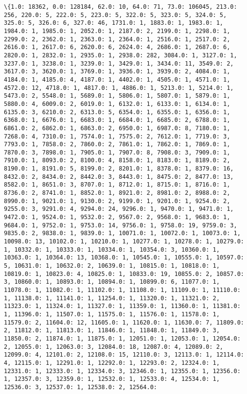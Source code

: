 \documentclass[11pt]{article}
\begin{document}
    \begin{Verbatim}[commandchars=\\\{\}]
\{1.0: 18362, 0.0: 128184, 62.0: 10, 64.0: 71, 73.0: 106045, 213.0: 256, 220.0: 5, 222.0: 5, 223.0: 5, 322.0: 5, 323.0: 5, 324.0: 5, 325.0: 5, 326.0: 6, 327.0: 46, 1731.0: 1, 1883.0: 1, 1983.0: 1, 1984.0: 1, 1985.0: 1, 2052.0: 1, 2187.0: 2, 2199.0: 1, 2298.0: 1, 2299.0: 2, 2362.0: 1, 2363.0: 1, 2364.0: 1, 2516.0: 1, 2517.0: 2, 2616.0: 1, 2617.0: 6, 2620.0: 6, 2624.0: 4, 2686.0: 1, 2687.0: 6, 2820.0: 1, 2832.0: 1, 2935.0: 1, 2938.0: 282, 3084.0: 1, 3127.0: 1, 3237.0: 1, 3238.0: 1, 3239.0: 1, 3429.0: 1, 3434.0: 11, 3549.0: 2, 3617.0: 3, 3620.0: 1, 3769.0: 1, 3936.0: 1, 3939.0: 2, 4084.0: 1, 4184.0: 1, 4185.0: 4, 4187.0: 1, 4402.0: 1, 4505.0: 1, 4571.0: 1, 4572.0: 12, 4718.0: 1, 4817.0: 1, 4886.0: 1, 5213.0: 1, 5214.0: 1, 5473.0: 2, 5548.0: 1, 5689.0: 1, 5806.0: 1, 5807.0: 1, 5879.0: 1, 5880.0: 4, 6009.0: 2, 6019.0: 1, 6132.0: 1, 6133.0: 1, 6134.0: 1, 6135.0: 3, 6210.0: 2, 6313.0: 5, 6354.0: 1, 6355.0: 1, 6356.0: 1, 6368.0: 1, 6676.0: 1, 6683.0: 1, 6684.0: 1, 6685.0: 2, 6788.0: 1, 6861.0: 2, 6862.0: 1, 6863.0: 2, 6950.0: 1, 6987.0: 8, 7180.0: 1, 7268.0: 4, 7310.0: 1, 7574.0: 1, 7575.0: 2, 7612.0: 1, 7719.0: 3, 7793.0: 1, 7858.0: 2, 7860.0: 2, 7861.0: 1, 7862.0: 1, 7869.0: 1, 7870.0: 3, 7898.0: 1, 7905.0: 1, 7907.0: 8, 7908.0: 3, 7909.0: 1, 7910.0: 1, 8093.0: 2, 8100.0: 4, 8158.0: 1, 8183.0: 1, 8189.0: 2, 8190.0: 1, 8191.0: 5, 8199.0: 2, 8201.0: 1, 8378.0: 1, 8379.0: 16, 8432.0: 2, 8434.0: 2, 8442.0: 3, 8443.0: 1, 8475.0: 2, 8477.0: 13, 8582.0: 1, 8651.0: 3, 8707.0: 1, 8712.0: 1, 8715.0: 1, 8716.0: 1, 8736.0: 2, 8741.0: 1, 8852.0: 1, 8921.0: 2, 8981.0: 2, 8988.0: 2, 8990.0: 1, 9021.0: 1, 9130.0: 2, 9199.0: 1, 9201.0: 1, 9254.0: 2, 9255.0: 3, 9291.0: 4, 9294.0: 24, 9296.0: 1, 9470.0: 1, 9471.0: 1, 9472.0: 1, 9524.0: 1, 9532.0: 2, 9567.0: 2, 9568.0: 1, 9683.0: 1, 9684.0: 1, 9752.0: 1, 9753.0: 14, 9756.0: 1, 9758.0: 19, 9759.0: 3, 9835.0: 2, 9838.0: 1, 9839.0: 1, 10071.0: 1, 10072.0: 1, 10073.0: 1, 10098.0: 13, 10102.0: 1, 10210.0: 1, 10277.0: 1, 10278.0: 1, 10279.0: 1, 10332.0: 1, 10333.0: 1, 10334.0: 1, 10354.0: 3, 10360.0: 1, 10363.0: 1, 10364.0: 13, 10368.0: 1, 10545.0: 1, 10555.0: 1, 10597.0: 5, 10631.0: 1, 10632.0: 2, 10639.0: 1, 10815.0: 1, 10818.0: 1, 10819.0: 1, 10823.0: 4, 10825.0: 1, 10833.0: 19, 10855.0: 2, 10857.0: 3, 10860.0: 1, 10893.0: 1, 10894.0: 1, 10899.0: 6, 11077.0: 1, 11078.0: 1, 11082.0: 1, 11102.0: 1, 11108.0: 1, 11109.0: 1, 11110.0: 1, 11138.0: 1, 11141.0: 1, 11254.0: 1, 11320.0: 1, 11321.0: 2, 11323.0: 1, 11324.0: 1, 11327.0: 1, 11359.0: 1, 11360.0: 1, 11381.0: 1, 11396.0: 1, 11507.0: 1, 11575.0: 1, 11576.0: 1, 11578.0: 1, 11579.0: 2, 11604.0: 12, 11605.0: 1, 11620.0: 1, 11630.0: 7, 11809.0: 2, 11812.0: 1, 11813.0: 1, 11846.0: 1, 11848.0: 1, 11849.0: 3, 11850.0: 2, 11874.0: 1, 11875.0: 1, 12051.0: 1, 12053.0: 1, 12054.0: 2, 12055.0: 1, 12063.0: 3, 12084.0: 18, 12087.0: 4, 12089.0: 2, 12099.0: 4, 12101.0: 2, 12108.0: 15, 12110.0: 3, 12113.0: 1, 12114.0: 4, 12115.0: 1, 12291.0: 1, 12292.0: 1, 12293.0: 2, 12324.0: 1, 12331.0: 1, 12333.0: 1, 12334.0: 3, 12346.0: 1, 12355.0: 1, 12356.0: 1, 12357.0: 3, 12359.0: 1, 12532.0: 1, 12533.0: 4, 12534.0: 1, 12536.0: 3, 12537.0: 1, 12538.0: 2, 12564.0: 
\end{Verbatim}
\end{document}
